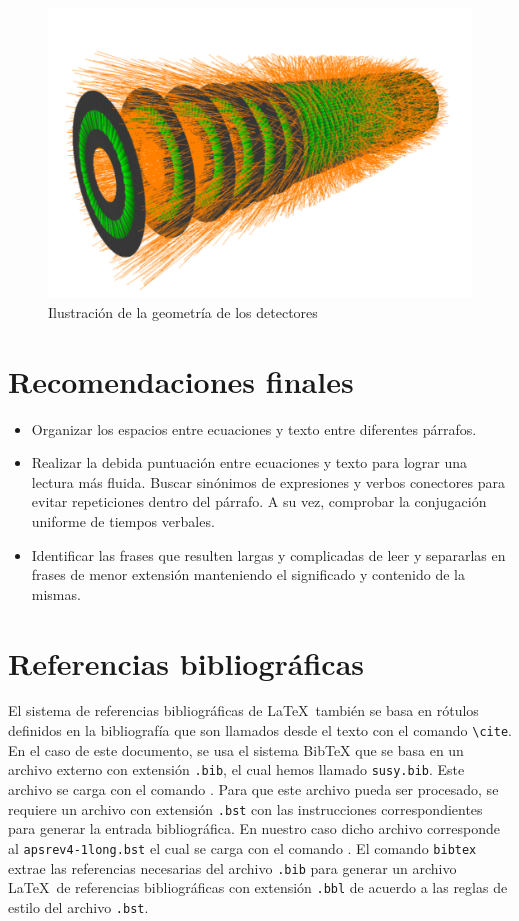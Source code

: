 \documentclass{article}
\begin{document}
\begin{figure}
    \centering
    \includegraphics[scale=0.2]{figures/cern_graphic}
    \caption{Ilustración de la geometría de los detectores}
    \label{fig:detector}
\end{figure}

\section{Recomendaciones finales}
\begin{itemize}
\item Organizar los espacios entre ecuaciones y texto entre diferentes párrafos.
\item Realizar la debida puntuación entre ecuaciones y
texto para lograr una lectura más fluida. Buscar sinónimos de expresiones
y verbos conectores para evitar repeticiones dentro del párrafo. A su vez, comprobar
la conjugación uniforme de tiempos verbales.
\item Identificar las frases que resulten largas y complicadas de
leer y separarlas en frases de menor extensión manteniendo el significado
y contenido de la mismas.
\end{itemize}

\section{Referencias bibliográficas}
El sistema de referencias bibliográficas de \LaTeX\ también se basa en rótulos definidos en la bibliografía que son llamados desde el texto con el comando  \verb|\cite|. En el caso de este documento, se usa el sistema BibTeX que se basa en un archivo externo con extensión \verb|.bib|, el cual hemos llamado \verb|susy.bib|. Este archivo  se carga con el comando \verb||. Para que este archivo pueda ser procesado, se requiere un archivo con extensión \verb|.bst|  con las instrucciones correspondientes para generar la entrada bibliográfica. En nuestro caso dicho  archivo corresponde al \verb|apsrev4-1long.bst| el cual se carga con el comando \verb||.
El comando \verb|bibtex| extrae las referencias necesarias del archivo \verb|.bib| para generar un archivo \LaTeX\ de referencias bibliográficas con extensión \verb|.bbl| de acuerdo a las reglas de estilo del archivo \verb|.bst|.
\end{document}
